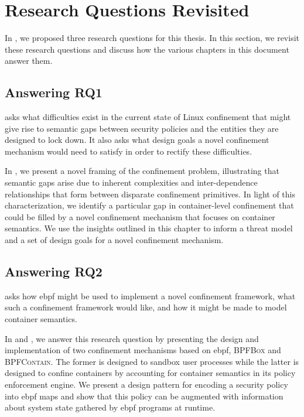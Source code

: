 \documentclass[
  fontsize=12pt,
  titlepage=firstiscover,
  paper=letter,
oneside,
  cleardoublepage=plain,
  parskip=half-,
  DIV=10,
  parindent,
  appendixprefix,
  chapterprefix,
  listof=totoc,
]{scrbook}
\newcommand{\bpfbox}{\textsc{BPFBox}}
\newcommand{\bpfcontain}{\textsc{BPFContain}}
\begin{document}
\section{Research Questions Revisited}\label{s:disc-rqs}

In , we proposed three research questions for this thesis. In this
section, we revisit these research questions and discuss how the various chapters in this
document answer them.

\subsection{Answering RQ1}\label{ss:disc-rq1}


 asks what difficulties exist in the current state of Linux confinement that
might give rise to semantic gaps between security policies and the entities they are
designed to lock down. It also asks what design goals a novel confinement mechanism would
need to satisfy in order to rectify these difficulties.

In , we present a novel framing of the confinement problem,
illustrating that semantic gaps arise due to inherent complexities and inter-dependence
relationships that form between disparate confinement primitives.  In light of this
characterization, we identify a particular gap in container-level confinement that could
be filled by a novel confinement mechanism that focuses on container semantics. We use the
insights outlined in this chapter to inform a threat model and a set of design goals for
a novel confinement mechanism.

\subsection{Answering RQ2}\label{ss:disc-rq2}


 asks how \gls{ebpf} might be used to implement a novel confinement framework,
what such a confinement framework would like, and how it might be made to model container
semantics.

In  and , we answer this research question by presenting
the design and implementation of two confinement mechanisms based on \gls{ebpf}, \bpfbox{}
and \bpfcontain{}. The former is designed to sandbox user processes while the latter is
designed to confine containers by accounting for container semantics in its policy
enforcement engine. We present a design pattern for encoding a security policy into
\gls{ebpf} maps and show that this policy can be augmented with information about
system state gathered by \gls{ebpf} programs at runtime.
\end{document}
